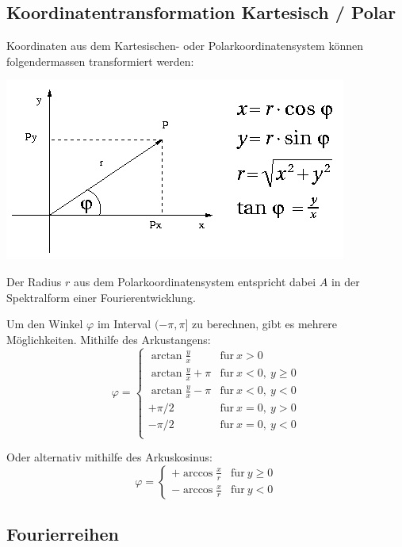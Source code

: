 \documentclass[10pt,a4paper]{scrartcl}
\begin{document}
\subsection{Koordinatentransformation Kartesisch / Polar}

Koordinaten aus dem Kartesischen- oder Polarkoordinatensystem können
folgendermassen transformiert werden:

\begin{center}
\includegraphics[scale=0.5]{img/Koordinatentransformation.png}
\end{center}

Der Radius $r$ aus dem Polarkoordinatensystem entspricht dabei $A$ in der
Spektralform einer Fourierentwicklung.

Um den Winkel $\varphi$ im Interval $(-\pi, \pi]$ zu berechnen, gibt es mehrere
Möglichkeiten. Mithilfe des Arkustangens:
$$\varphi = \begin{cases}
\arctan\frac{y}{x} & \mathrm{f\ddot ur}\ x > 0\\
\arctan\frac{y}{x} + \pi & \mathrm{f\ddot ur}\ x < 0,\ y \geq 0\\
\arctan\frac{y}{x} - \pi & \mathrm{f\ddot ur}\ x < 0,\ y < 0\\
+\pi/2 & \mathrm{f\ddot ur}\ x = 0,\ y > 0\\
-\pi/2 & \mathrm{f\ddot ur}\ x = 0,\ y < 0\\
\end{cases}$$

Oder alternativ mithilfe des Arkuskosinus:
$$\varphi = \begin{cases}
+\arccos\frac{x}{r} & \mathrm{f\ddot ur}\ y\geq 0\\
-\arccos\frac{x}{r} & \mathrm{f\ddot ur}\ y<0
\end{cases}$$


\subsection{Fourierreihen}
\end{document}
